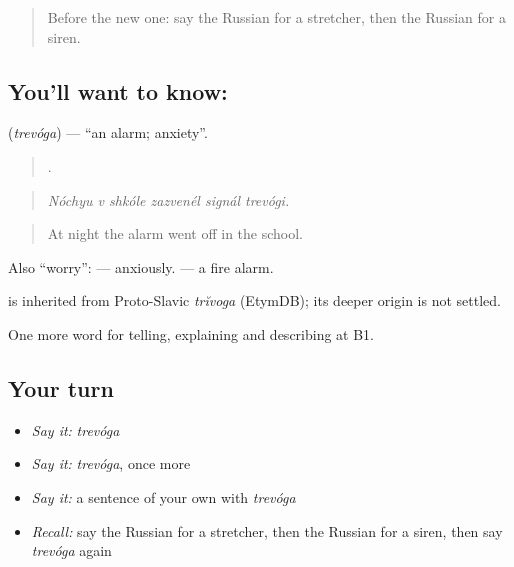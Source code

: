\begin{quote}
Before the new one: say the Russian for a stretcher, then the Russian for a siren.
\end{quote}

\subsection*{You'll want to know: }
\textbf{} (\emph{trevóga}) — \textquotedblleft{}an alarm; anxiety\textquotedblright{}.

\begin{quote}
     .
\end{quote}

\begin{quote}
\emph{Nóchyu v shkóle zazvenél signál trevógi.}
\end{quote}

\begin{quote}
At night the alarm went off in the school.
\end{quote}

Also \textquotedblleft{}worry\textquotedblright{}: \emph{ } — anxiously. \emph{ } — a fire alarm.

\begin{cousinweb}
\emph{} is inherited from Proto-Slavic \emph{trĭvoga} (EtymDB); its deeper origin is not settled.
\end{cousinweb}

\begin{grammarlens}[title={What you've built}]
One more word for telling, explaining and describing at B1.
\end{grammarlens}

\subsection*{Your turn}
\begin{itemize}
\raggedright
  \item \emph{Say it:} \emph{trevóga}
  \item \emph{Say it:} \emph{trevóga}, once more
  \item \emph{Say it:} a sentence of your own with \emph{trevóga}
  \item \emph{Recall:} say the Russian for a stretcher, then the Russian for a siren, then say \emph{trevóga} again
\end{itemize}

